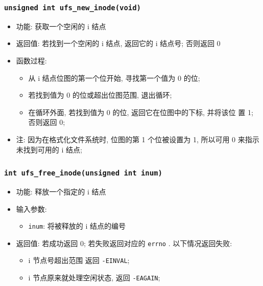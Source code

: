 \documentclass[nofonts]{ctexart}
\begin{document}
  \subsubsection{\texttt{unsigned int ufs\_new\_inode(void)}}
  \begin{itemize}
\item
  功能: 获取一个空闲的 i 结点
\item
  返回值: 若找到一个空闲的 i 结点, 返回它的 i 结点号; 否则返回 0
\item
  函数过程:

  \begin{itemize}
  \item
    从 i 结点位图的第一个位开始, 寻找第一个值为 0 的位;
  \item
    若找到值为 0 的位或超出位图范围, 退出循环;
  \item
    在循环外面, 若找到值为 0 的位, 返回它在位图中的下标, 并将该位 置 1;
    否则返回 0;
  \end{itemize}
\item
  注: 因为在格式化文件系统时, 位图的第 1 个位被设置为 1, 所以可用 0
  来指示未找到可用的 i 结点;
  \end{itemize}
  \subsubsection{\texttt{int ufs\_free\_inode(unsigned int inum)}}
  \begin{itemize}
\item
  功能: 释放一个指定的 i 结点
\item
  输入参数:

  \begin{itemize}
  \item
    \texttt{inum}: 将被释放的 i 结点的编号
  \end{itemize}
\item
  返回值: 若成功返回 0; 若失败返回对应的 \texttt{errno} .
  以下情况返回失败:

  \begin{itemize}
  \item
    i 节点号超出范围 返回 \texttt{-EINVAL};
  \item
    i 节点原来就处理空闲状态, 返回 \texttt{-EAGAIN};
  \end{itemize}
\end{itemize}
\end{document}

